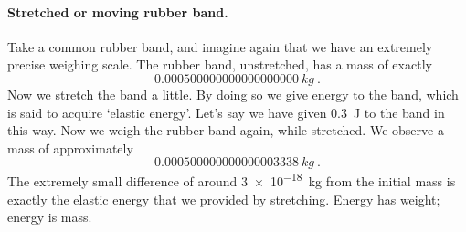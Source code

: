 \documentclass[a4paper,12pt,%
onecolumn,oneside,%
british%
]{memoir}
\renewcommand*{\|}[1][]{\nonscript\:#1\vert\nonscript\:\mathopen{}}
\begin{document}

\paragraph{Stretched or moving rubber band.}

%
%
Take a common rubber band, and imagine again that we have an extremely precise weighing scale. The rubber band, unstretched, has a mass of exactly
\begin{equation*}
  \qty{0.000500000000000000000}{kg}\ .
\end{equation*}
Now we stretch the band a little. By doing so we give energy to the band, which is said to acquire \enquote*{elastic energy}. Let's say we have given \qty{0.3}{J} to the band in this way.
Now we weigh the rubber band again, while stretched. We observe a mass of approximately
\begin{equation*}
  \qty{0.000500000000000003338}{kg} \ .
\end{equation*}
The extremely small difference of around \qty{3e-18}{kg} from the initial mass
is exactly the elastic energy that we provided by stretching.
Energy has weight; energy is mass.
\end{document}
